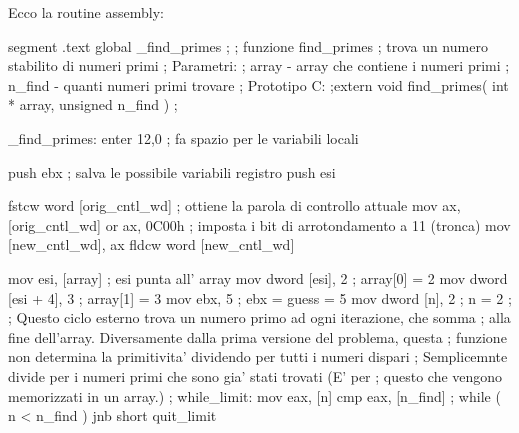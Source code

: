 Ecco la routine assembly:


\begin{AsmCodeListing}[label=prime2.asm]
segment .text
        global  _find_primes
;
; funzione find_primes
; trova un numero stabilito di numeri primi
; Parametri:
;   array - array che contiene i numeri primi
;   n_find - quanti numeri primi trovare
; Prototipo C:
;extern void find_primes( int * array, unsigned n_find )
;

_find_primes:
        enter   12,0                    ; fa spazio per le variabili locali

        push    ebx                     ; salva le possibile variabili registro
        push    esi

        fstcw   word [orig_cntl_wd]     ; ottiene la parola di controllo attuale
        mov     ax, [orig_cntl_wd]
        or      ax, 0C00h               ; imposta i bit di arrotondamento a 11 (tronca)
        mov     [new_cntl_wd], ax
        fldcw   word [new_cntl_wd]

        mov     esi, [array]            ; esi punta all' array
        mov     dword [esi], 2          ; array[0] = 2
        mov     dword [esi + 4], 3      ; array[1] = 3
        mov     ebx, 5                  ; ebx = guess = 5
        mov     dword [n], 2            ; n = 2
;
; Questo ciclo esterno trova un numero primo ad ogni iterazione, che somma
; alla fine dell'array. Diversamente dalla prima versione del problema, questa
; funzione non determina la primitivita' dividendo per tutti i numeri dispari
; Semplicemnte divide per i numeri primi che sono gia' stati trovati (E' per
; questo che vengono memorizzati in un array.)
;
while_limit:
        mov     eax, [n]
        cmp     eax, [n_find]           ; while ( n < n_find )
        jnb     short quit_limit


\end{AsmCodeListing}
